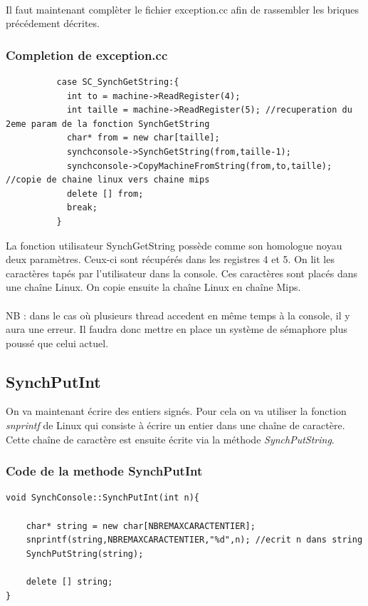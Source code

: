 \documentclass[a4paper,10pt]{report}
\begin{document}
     ~~\\
     Il faut maintenant complèter le fichier exception.cc afin de rassembler les briques précédement décrites.\\
    \textcolor{TealBlue}{\subsubsection*{Completion de exception.cc}}
    \begin{lstlisting}
          case SC_SynchGetString:{
            int to = machine->ReadRegister(4);
            int taille = machine->ReadRegister(5); //recuperation du 2eme param de la fonction SynchGetString
            char* from = new char[taille];
            synchconsole->SynchGetString(from,taille-1);
            synchconsole->CopyMachineFromString(from,to,taille); //copie de chaine linux vers chaine mips 
            delete [] from;
            break;
          }     
    \end{lstlisting}
    La fonction utilisateur SynchGetString possède comme son homologue noyau deux paramètres. Ceux-ci sont récupérés dans les registres 4 et 5. On lit les
    caractères tapés par l'utilisateur dans la console. Ces caractères sont placés dans une chaîne Linux. On copie ensuite la chaîne Linux en chaîne Mips.\\
    ~~\\
    NB : dans le cas où plusieurs thread accedent en même temps à la console, il y aura une erreur. Il faudra donc mettre en place un système de sémaphore plus
    poussé que celui actuel.
    \newpage
    \textcolor{NavyBlue}{\subsection{SynchPutInt}}
    On va maintenant écrire des entiers signés. Pour cela on va utiliser la fonction \emph{snprintf} de Linux qui consiste à écrire un entier dans une 
    chaîne de caractère. Cette chaîne de caractère est ensuite écrite via la méthode \emph{SynchPutString}.

    \textcolor{TealBlue}{\subsubsection*{Code de la methode SynchPutInt}}
    \begin{lstlisting}
void SynchConsole::SynchPutInt(int n){

	char* string = new char[NBREMAXCARACTENTIER];
	snprintf(string,NBREMAXCARACTENTIER,"%d",n); //ecrit n dans string 
	SynchPutString(string);

	delete [] string;
}     
    \end{lstlisting}
    
\end{document}
